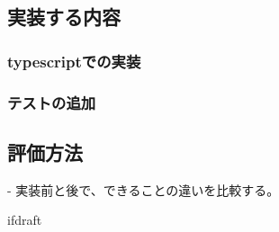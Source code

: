 \documentclass{jsarticle}
\begin{document}
    \subsection{実装する内容}

    \subsubsection{typescriptでの実装}

    \subsubsection{テストの追加}


    \subsection{評価方法}
    - 実装前と後で、できることの違いを比較する。
















    \expandafter\ifx\csname ifdraft\endcsname\relax
\end{document}
